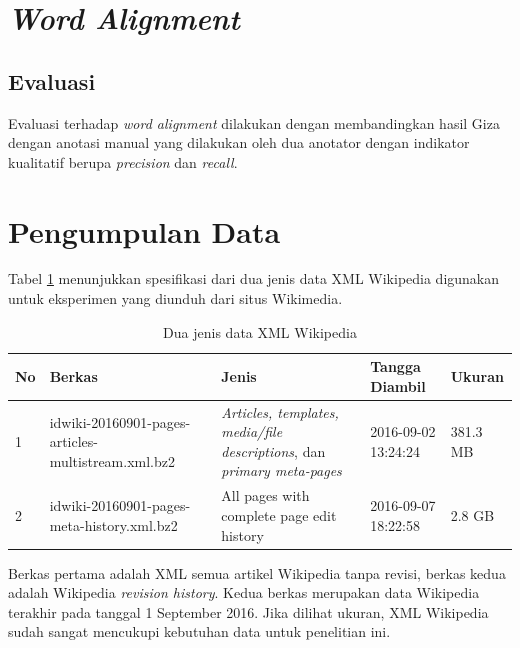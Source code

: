 \section{\textit{Word Alignment}}


\subsection{}


\subsection{Evaluasi}
Evaluasi terhadap \textit{word alignment} dilakukan dengan membandingkan hasil Giza dengan anotasi manual yang dilakukan oleh dua anotator dengan indikator kualitatif berupa \textit{precision} dan \textit{recall}. 

\section{Pengumpulan Data}
Tabel \ref{table:dataXML} menunjukkan spesifikasi dari dua jenis data XML Wikipedia digunakan untuk eksperimen yang diunduh dari situs Wikimedia.

\begin{table}
	\centering
	\caption{Dua jenis data XML Wikipedia}
	\label{table:dataXML}
		\begin{tabular}{|p{0.7cm}|p{4cm}|p{4cm}|p{2cm}|p{1.5cm}|}
			\hline
			No & Berkas & Jenis & Tangga Diambil & Ukuran \\ 
			\hline
			1    & 
			idwiki-20160901-pages-articles-multistream.xml.bz2   & \textit{Articles, templates, media/file descriptions}, dan \textit{primary meta-pages}  & 2016-09-02 13:24:24  & 
			381.3 MB  \\ \hline
			2    & 
			idwiki-20160901-pages-meta-history.xml.bz2     & 
			All pages with complete page edit history  & 
			2016-09-07 18:22:58  & 
			2.8 GB    \\ \hline
		\end{tabular}
\end{table}
\noindent Berkas pertama adalah XML semua artikel Wikipedia tanpa revisi, berkas kedua adalah Wikipedia \textit{revision history}. Kedua berkas merupakan data Wikipedia terakhir pada tanggal 1 September 2016. Jika dilihat ukuran, XML Wikipedia sudah sangat mencukupi kebutuhan data untuk penelitian ini.

